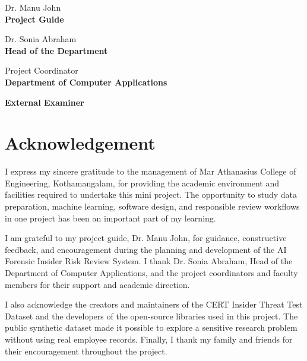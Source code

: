 \documentclass[12pt,a4paper,oneside]{report}
\newcommand{\guide}{Dr. Manu John}
\newcommand{\hod}{Dr. Sonia Abraham}
\begin{document}
\vspace{1.25cm}
\noindent
\begin{minipage}[t]{0.45\textwidth}
\centering
{\small \guide}\\[0.12cm]
{\small\bfseries Project Guide}
\end{minipage}
\hfill
\begin{minipage}[t]{0.45\textwidth}
\centering
{\small \hod}\\[0.12cm]
{\small\bfseries Head of the Department}
\end{minipage}

\vspace{1.25cm}
\noindent
\begin{minipage}[t]{0.45\textwidth}
\centering
{\small Project Coordinator}\\[0.12cm]
{\small\bfseries Department of Computer Applications}
\end{minipage}
\hfill
\begin{minipage}[t]{0.45\textwidth}
\centering
\vspace{0.12cm}
{\small\bfseries External Examiner}
\end{minipage}

\clearpage
{}
\pagestyle{reportstyle}

\chapter*{Acknowledgement}
I express my sincere gratitude to the management of Mar Athanasius
College of Engineering, Kothamangalam, for providing the academic
environment and facilities required to undertake this mini project.
The opportunity to study data preparation, machine learning, software
design, and responsible review workflows in one project has been an
important part of my learning.

I am grateful to my project guide, Dr. Manu John, for guidance,
constructive feedback, and encouragement during the planning and
development of the AI Forensic Insider Risk Review System. I thank
Dr. Sonia Abraham, Head of the Department of Computer Applications, and
the project coordinators and faculty members for their support and
academic direction.

I also acknowledge the creators and maintainers of the CERT Insider
Threat Test Dataset and the developers of the open-source libraries used
in this project. The public synthetic dataset made it possible to
explore a sensitive research problem without using real employee
records. Finally, I thank my family and friends for their encouragement
throughout the project.
\end{document}
